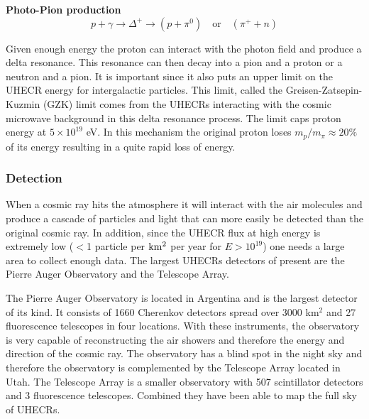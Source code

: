 \textbf{Photo-Pion production }
\begin{equation}
    p + \gamma \rightarrow \Delta^+ \rightarrow (p + \pi^0)\quad \text{or} \quad (\pi^+ + n)
    \label{eq:delta_resonance}
\end{equation}

Given enough energy the proton can interact with the photon field and produce a delta resonance. This resonance can then decay into a pion and a proton or a neutron and a pion. 
It is important since it also puts an upper limit on the UHECR energy for intergalactic particles. 
This limit, called the Greisen-Zatsepin-Kuzmin (GZK) limit comes from the UHECRs interacting with the cosmic microwave background in this delta resonance process. The limit caps proton energy at $5\times 10^{19}$ eV.
In this mechanism the original proton loses $m_p/m_\pi \approx 20\% $ of its energy resulting in a quite rapid loss of energy.






\subsubsection{Detection}
When a cosmic ray hits the atmosphere it will interact with the air molecules and produce a cascade of particles and light that can more easily be detected than 
the original cosmic ray. In addition, since the UHECR flux at high energy is extremely low ($<$1 particle per $\rm km^2$ per year for $E > 10^{19}$) one needs a large area to collect enough data. 
The largest UHECRs detectors of present are the Pierre Auger Observatory and the Telescope Array. 

The Pierre Auger Observatory is located in Argentina and is the largest detector of its kind. It consists of 1660  Cherenkov detectors spread over 3000 km$^2$ and 27 fluorescence telescopes in four locations. With 
these instruments, the observatory is very capable of reconstructing the air showers and therefore the energy and direction of the cosmic ray. The observatory has a blind spot in the night sky 
and therefore the observatory is complemented by the Telescope Array located in Utah. The Telescope Array is a smaller observatory with 507 scintillator detectors and 3 fluorescence telescopes. Combined they have been able to map the full sky of UHECRs.  

